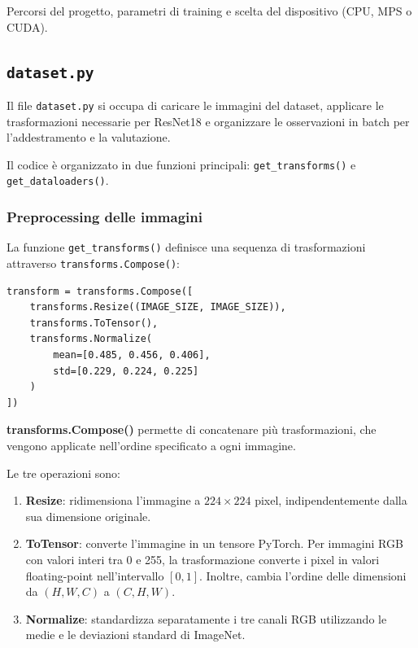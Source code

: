 \documentclass[10pt,a4paper,oneside]{book}
\begin{document}
Percorsi del progetto, parametri di training e scelta del dispositivo
(CPU, MPS o CUDA).


\subsection{\texttt{dataset.py}}

Il file \texttt{dataset.py} si occupa di caricare le immagini del dataset,
applicare le trasformazioni necessarie per ResNet18 e organizzare le
osservazioni in batch per l'addestramento e la valutazione.

Il codice è organizzato in due funzioni principali:
\texttt{get\_transforms()} e \texttt{get\_dataloaders()}.

\subsubsection{Preprocessing delle immagini}

La funzione \texttt{get\_transforms()} definisce una sequenza di
trasformazioni attraverso \texttt{transforms.Compose()}:

\begin{verbatim}
transform = transforms.Compose([
    transforms.Resize((IMAGE_SIZE, IMAGE_SIZE)),
    transforms.ToTensor(),
    transforms.Normalize(
        mean=[0.485, 0.456, 0.406],
        std=[0.229, 0.224, 0.225]
    )
])
\end{verbatim}

\textbf{transforms.Compose()} permette di concatenare più trasformazioni,
che vengono applicate nell'ordine specificato a ogni immagine.

Le tre operazioni sono:

\begin{enumerate}
    \item \textbf{Resize}: ridimensiona l'immagine a
    $224 \times 224$ pixel, indipendentemente dalla sua dimensione
    originale.

    \item \textbf{ToTensor}: converte l'immagine in un tensore PyTorch.
    Per immagini RGB con valori interi tra 0 e 255, la trasformazione
    converte i pixel in valori floating-point nell'intervallo $[0,1]$.
    Inoltre, cambia l'ordine delle dimensioni da
    $(H,W,C)$ a $(C,H,W)$.

    \item \textbf{Normalize}: standardizza separatamente i tre canali
    RGB utilizzando le medie e le deviazioni standard di ImageNet.
\end{enumerate}
\end{document}

